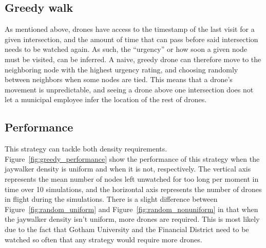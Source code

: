 \documentclass{article}
\begin{document}
\subsection{Greedy walk}
\label{sub:greedy_walk}
As mentioned above, drones have access to the timestamp of the last visit for a given intersection, and the amount of time that can pass before said intersection needs to be watched again. As such, the ``urgency'' or how soon a given node must be visited, can be inferred. A naive, greedy drone can therefore move to the neighboring node with the highest urgency rating, and choosing randomly between neighbors when some nodes are tied. This means that a drone’s movement is unpredictable, and seeing a drone above one intersection does not let a municipal employee infer the location of the rest of drones.

\subsection{Performance}
\label{sub:greey_performance}
This strategy can tackle both density requirements. Figure~\ref{fig:greedy_performance} show the performance of this strategy when the jaywalker density is uniform and when it is not, respectively. The vertical axis represents the mean number of nodes left unwatched for too long per moment in time over 10 simulations, and the horizontal axis represents the number of drones in flight during the simulations. There is a slight difference between Figure~\ref{fig:random_uniform} and Figure~\ref{fig:random_nonuniform} in that when the jaywalker density isn't uniform, more drones are required. This is most likely due to the fact that Gotham University and the Financial District need to be watched so often that any strategy would require more drones.
\end{document}
